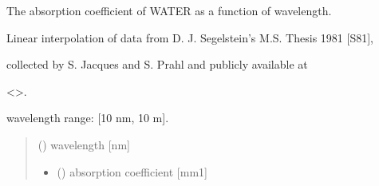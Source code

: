\documentclass[letterpaper,10pt,english]{sphinxmanual}
\begin{document}
\begin{fulllineitems}
\label{\detokenize{03_absorption_coefficient:skinoptics.absorption_coefficient.mua_wat_Segelstein}}
\pysigstartsignatures
{}
\pysigstopsignatures
\begin{DUlineblock}{0em}
\item[] The absorption coefficient of WATER as a function of wavelength.
\item[] Linear interpolation of data from D. J. Segelstein’s M.S. Thesis 1981 {[}S81{]},
\item[] collected by S. Jacques and S. Prahl and publicly available at
\item[] \textless{}\textgreater{}.
\end{DUlineblock}

\begin{DUlineblock}{0em}
\item[] wavelength range: {[}10 nm, 10 m{]}.
\end{DUlineblock}
\begin{quote}\begin{description}
\sphinxAtStartPar
{} () \textendash{} wavelength {[}nm{]}

\sphinxAtStartPar
\begin{itemize}
\item {} 
\sphinxAtStartPar
{} () \textendash{} absorption coefficient {[}mm\sphinxhyphen{}1{]}

\end{itemize}


\end{description}\end{quote}

\end{fulllineitems}

\end{document}
